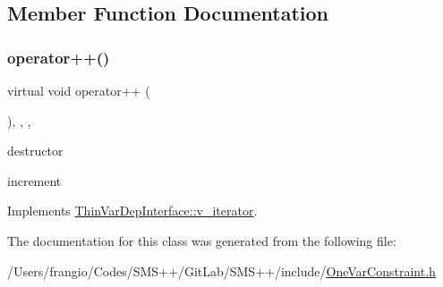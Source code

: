 \subsection{Member Function Documentation}
\mbox{\label{class_s_m_spp__di__unipi__it_1_1_one_var_constraint_1_1v__iterator_af860fe44bc54c0cbca8e733ab0e954e0}} 
\subsubsection{\texorpdfstring{operator++()}{operator++()}}
{\footnotesize\ttfamily virtual void operator++ (\begin{DoxyParamCaption}\item[{void}]{ }\end{DoxyParamCaption})\hspace{0.3cm}{\ttfamily [inline]}, {\ttfamily [final]}, {\ttfamily [override]}, {\ttfamily [virtual]}}



destructor 

increment 

Implements \mbox{\hyperlink{group___thin_var_dep_interface___c_l_a_s_s_e_s_ga79fc9d17094dc591d6b48bc296028d51}{Thin\+Var\+Dep\+Interface\+::v\+\_\+iterator}}.



The documentation for this class was generated from the following file\+:\begin{DoxyCompactItemize}
\item 
/\+Users/frangio/\+Codes/\+S\+M\+S++/\+Git\+Lab/\+S\+M\+S++/include/\mbox{\hyperlink{_one_var_constraint_8h}{One\+Var\+Constraint.\+h}}\end{DoxyCompactItemize}
